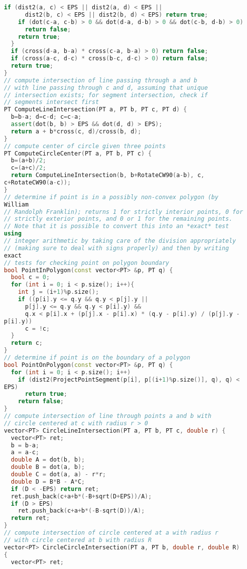 \begin{lstlisting}[language=C++]
    if (dist2(a, c) < EPS || dist2(a, d) < EPS ||
      dist2(b, c) < EPS || dist2(b, d) < EPS) return true;
    if (dot(c-a, c-b) > 0 && dot(d-a, d-b) > 0 && dot(c-b, d-b) > 0)
      return false;
    return true;
  }
  if (cross(d-a, b-a) * cross(c-a, b-a) > 0) return false;
  if (cross(a-c, d-c) * cross(b-c, d-c) > 0) return false;
  return true;
}
// compute intersection of line passing through a and b
// with line passing through c and d, assuming that unique
// intersection exists; for segment intersection, check if
// segments intersect first
PT ComputeLineIntersection(PT a, PT b, PT c, PT d) {
  b=b-a; d=c-d; c=c-a;
  assert(dot(b, b) > EPS && dot(d, d) > EPS);
  return a + b*cross(c, d)/cross(b, d);
}
// compute center of circle given three points
PT ComputeCircleCenter(PT a, PT b, PT c) {
  b=(a+b)/2;
  c=(a+c)/2;
  return ComputeLineIntersection(b, b+RotateCW90(a-b), c, 
c+RotateCW90(a-c));
}
// determine if point is in a possibly non-convex polygon (by 
William
// Randolph Franklin); returns 1 for strictly interior points, 0 for
// strictly exterior points, and 0 or 1 for the remaining points.
// Note that it is possible to convert this into an *exact* test 
using
// integer arithmetic by taking care of the division appropriately
// (making sure to deal with signs properly) and then by writing 
exact
// tests for checking point on polygon boundary
bool PointInPolygon(const vector<PT> &p, PT q) {
  bool c = 0;
  for (int i = 0; i < p.size(); i++){
    int j = (i+1)%p.size();
    if ((p[i].y <= q.y && q.y < p[j].y || 
      p[j].y <= q.y && q.y < p[i].y) &&
      q.x < p[i].x + (p[j].x - p[i].x) * (q.y - p[i].y) / (p[j].y - 
p[i].y))
      c = !c;
  }
  return c;
}
// determine if point is on the boundary of a polygon
bool PointOnPolygon(const vector<PT> &p, PT q) {
  for (int i = 0; i < p.size(); i++)
    if (dist2(ProjectPointSegment(p[i], p[(i+1)%p.size()], q), q) < 
EPS)
      return true;
    return false;
}
// compute intersection of line through points a and b with
// circle centered at c with radius r > 0
vector<PT> CircleLineIntersection(PT a, PT b, PT c, double r) {
  vector<PT> ret;
  b = b-a;
  a = a-c;
  double A = dot(b, b);
  double B = dot(a, b);
  double C = dot(a, a) - r*r;
  double D = B*B - A*C;
  if (D < -EPS) return ret;
  ret.push_back(c+a+b*(-B+sqrt(D+EPS))/A);
  if (D > EPS)
    ret.push_back(c+a+b*(-B-sqrt(D))/A);
  return ret;
}
// compute intersection of circle centered at a with radius r
// with circle centered at b with radius R
vector<PT> CircleCircleIntersection(PT a, PT b, double r, double R) 
{
  vector<PT> ret;

\end{lstlisting}
